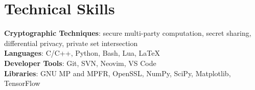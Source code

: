 \documentclass[letterpaper,11pt]{article}
\begin{document}
\section{Technical Skills}
\begin{itemize}[leftmargin=0.15in, label={}]
    \small{\item{
          \textbf{Cryptographic Techniques}{: secure multi-party computation, secret sharing, differential privacy, private set intersection} \\
          \textbf{Languages}{: C/C++, Python, Bash, Lua, \LaTeX} \\
          \textbf{Developer Tools}{: Git, SVN, Neovim, VS Code } \\
          \textbf{Libraries}{: GNU MP and MPFR, OpenSSL, NumPy, SciPy, Matplotlib, TensorFlow}
          }}
\end{itemize}


\end{document}
